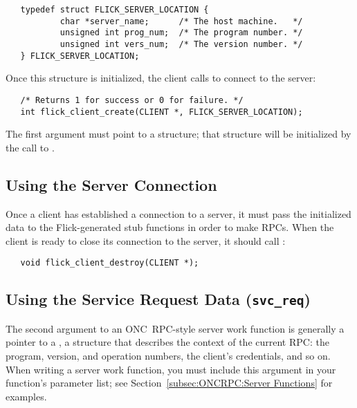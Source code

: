\begin{verbatim}
   typedef struct FLICK_SERVER_LOCATION {
           char *server_name;      /* The host machine.   */
           unsigned int prog_num;  /* The program number. */
           unsigned int vers_num;  /* The version number. */
   } FLICK_SERVER_LOCATION;
\end{verbatim}

\noindent Once this structure is initialized, the client calls
 to connect to the server:

\begin{verbatim}
   /* Returns 1 for success or 0 for failure. */
   int flick_client_create(CLIENT *, FLICK_SERVER_LOCATION);
\end{verbatim}

\noindent The first argument must point to a  structure; that
structure will be initialized by the call to .



\subsection{Using the Server Connection}
\label{subsec:Using the Server Connection}

Once a client has established a connection to a server, it must pass the
initialized  data to the Flick-generated stub functions in order
to make RPCs.  When the client is ready to close its connection to the server,
it should call :

\begin{verbatim}
   void flick_client_destroy(CLIENT *);
\end{verbatim}



\subsection{Using the Service Request Data (\texttt{svc\_req})}
\label{subsec:Using the Service Request Data}

The second argument to an ONC~RPC-style server work function is generally a
pointer to a , a structure that describes the context of
the current RPC: the program, version, and operation numbers, the client's
credentials, and so on.  When writing a server work function, you must include
this argument in your function's parameter list; see
Section~\ref{subsec:ONCRPC:Server Functions} for examples.

